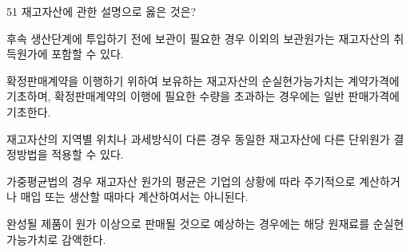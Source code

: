 \begin{question}{51}
재고자산에 관한 설명으로 옳은 것은?
\begin{choices}
  \item 후속 생산단계에 투입하기 전에 보관이 필요한 경우 이외의 보관원가는 재고자산의 취득원가에 포함할 수 있다.
  \item 확정판매계약을 이행하기 위하여 보유하는 재고자산의 순실현가능가치는 계약가격에 기초하며, 확정판매계약의 이행에 필요한 수량을 초과하는 경우에는 일반 판매가격에 기초한다.
  \item 재고자산의 지역별 위치나 과세방식이 다른 경우 동일한 재고자산에 다른 단위원가 결정방법을 적용할 수 있다.
  \item 가중평균법의 경우 재고자산 원가의 평균은 기업의 상황에 따라 주기적으로 계산하거나 매입 또는 생산할 때마다 계산하여서는 아니된다.
  \item 완성될 제품이 원가 이상으로 판매될 것으로 예상하는 경우에는 해당 원재료를 순실현가능가치로 감액한다.
\end{choices}
\end{question}
